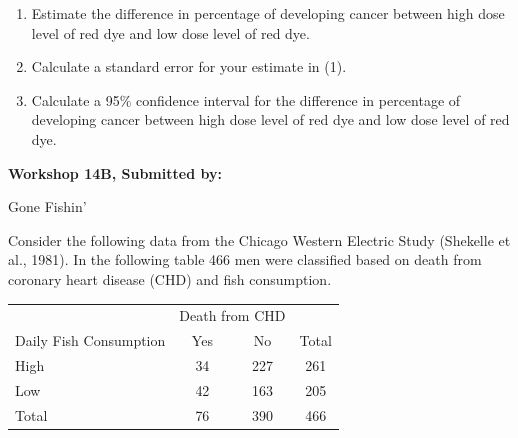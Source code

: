 \documentclass[11pt, chapterprefix=true]{scrbook}\usepackage[]{graphicx}\usepackage[]{color}
\begin{document}
\begin{exercises}
\begin{exercise}
\begin{enumerate}
  \item Estimate the difference in percentage of developing cancer between high dose level of red dye and low dose level of red dye.
  \item Calculate a standard error for your estimate in (1).
  \item Calculate a 95\% confidence interval for the difference in percentage of developing cancer between high dose level of red dye and low dose level of red dye.
\end{enumerate}

\end{exercise} 
\begin{solution}  %

\end{solution}

\clearpage

    \begin{exercise}  %

    \begin{center}
\begin{flushleft}\textbf{\large \hfill Workshop 14B, Submitted by: }\end{flushleft}

\end{center}

Gone Fishin'

Consider the following data from the Chicago Western Electric Study (Shekelle et al., 1981). In the following table 466 men were classified based on death from coronary heart disease (CHD) and fish consumption.
	
\begin{center}				
\begin{tabular}{@{} lccc @{}} \hline
& \multicolumn{2}{c}{Death from CHD} \\ 	 		 
Daily Fish Consumption &	Yes &	No &	Total \\ \hline
High &	34 &	227 &	261 \\
Low	& 42 &	163 &	205 \\ \hline
Total &	76 &	390 &	466 \\ \hline
\end{tabular}
\end{center} 
			

\end{exercise}
\end{exercises}
\end{document}

